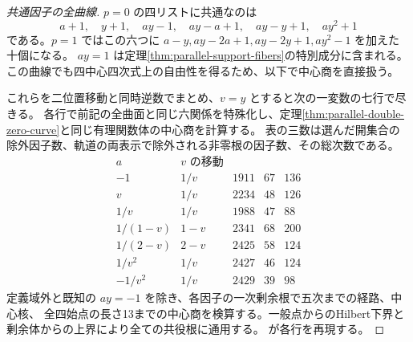 \begin{proof}[共通因子の全曲線]
$p=0$ の四リストに共通なのは
\[
 a+1,\quad y+1,\quad ay-1,\quad ay-a+1,\quad ay-y+1,\quad ay^2+1
\]
である。$p=1$ ではこの六つに $a-y,ay-2a+1,ay-2y+1,ay^2-1$ を加えた十個になる。
$ay=1$ は定理\ref{thm:parallel-support-fibers}の特別成分に含まれる。この曲線でも四中心四次式上の自由性を得るため、以下で中心商を直接扱う。

これらを二位置移動と同時逆数でまとめ、$v=y$ とすると次の一変数の七行で尽きる。
各行で前記の全曲面と同じ六関係を特殊化し、定理\ref{thm:parallel-double-zero-curve}と同じ有理関数体の中心商を計算する。
表の三数は選んだ開集合の除外因子数、軌道の両表示で除外される非零根の因子数、その総次数である。
\[
\begin{array}{c|c|rrr}
a&v\text{ の移動}& & &\\\hline
-1&1/v&1911&67&136\\
v&1/v&2234&48&126\\
1/v&1/v&1988&47&88\\
1/(1-v)&1-v&2341&68&200\\
1/(2-v)&2-v&2425&58&124\\
1/v^2&1/v&2427&46&124\\
-1/v^2&1/v&2429&39&98
\end{array}
\]
定義域外と既知の $ay=-1$ を除き、各因子の一次剰余根で五次までの経路、中心核、
全四始点の長さ13までの中心商を検算する。一般点からのHilbert下界と剰余体からの上界により全ての共役根に通用する。
 が各行を再現する。
\end{proof}

